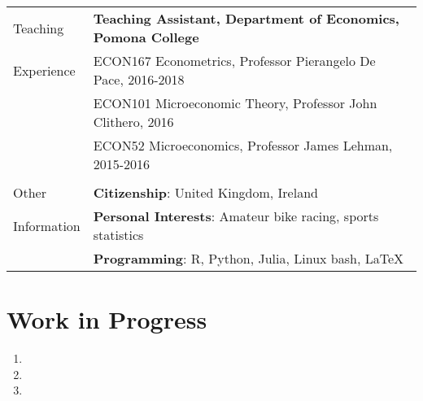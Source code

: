 \documentclass[letterpaper,11pt,oneside]{article}
\begin{document}
\begin{longtable}{@{} l l}
\Large{Teaching}  
    &\textbf{Teaching Assistant, Department of Economics, Pomona College}\\  
\Large{Experience}  
    & ECON167 Econometrics, Professor Pierangelo De Pace, 2016-2018 \\
    & ECON101 Microeconomic Theory, Professor John Clithero, 2016 \\
    & ECON52 Microeconomics, Professor James Lehman, 2015-2016 \\

\\[17ex]
\Large{Other}       & \textbf{Citizenship}: United Kingdom, Ireland \\
\Large{Information} & \textbf{Personal Interests}: Amateur bike racing, sports statistics \\
                    & \textbf{Programming}: R, Python, Julia, Linux bash, \LaTeX \vspace{0.2cm} \\
%    
%    
%    
\end{longtable}


\newpage
\onehalfspacing
\restoregeometry
{}

\section*{Work in Progress}
\begin{enumerate}[itemsep=2.5pt, label={}]
    \item {}
    \item {}
    \item {}
\end{enumerate}
\end{document}
